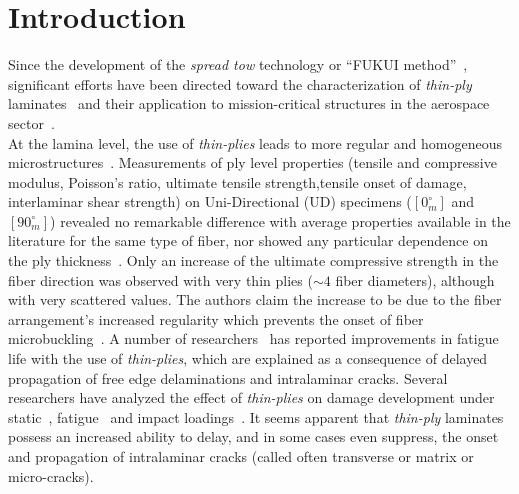 \documentclass[review]{elsarticle}
\begin{document}
\linenumbers


\section{Introduction}

Since the development of the \emph{spread tow} technology or ``FUKUI method''~\cite{Kawabe2008}, significant efforts have been directed toward the characterization of \emph{thin-ply} laminates~\cite{Yamaguchi2005,Sihn2007,Yokozeki2008,Yokozeki2010,Saito2012,Arteiro2013,Arteiro2014,Amacher2014,Guillamet2014,Cugnoni2018} and their application to mission-critical structures in the aerospace sector~\cite{Kopp2017}.\\%
At the lamina level, the use of \emph{thin-plies} leads to more regular and homogeneous microstructures~\cite{Saito2012,Amacher2014}. Measurements of ply level properties (tensile and compressive modulus, Poisson's ratio, ultimate tensile strength,tensile onset of damage, interlaminar shear strength) on Uni-Directional (UD) specimens ($\left[0_{m}^{\circ}\right]$ and $\left[90_{m}^{\circ}\right]$) revealed no remarkable difference with average properties available in the literature for the same type of fiber, nor showed any particular dependence on the ply thickness~\cite{Amacher2014}. Only an increase of the ultimate compressive strength in the fiber direction was observed with very thin plies ($\sim4$ fiber diameters), although with very scattered values. The authors claim the increase to be due to the fiber arrangement's increased regularity which prevents the onset of fiber microbuckling~\cite{Amacher2014}. A number of researchers~\cite{Yamaguchi2005,Sihn2007,Yokozeki2008} has reported improvements in fatigue life with the use of \emph{thin-plies}, which are explained as a consequence of delayed propagation of free edge delaminations and intralaminar cracks. Several researchers have analyzed the effect of \emph{thin-plies} on damage development under static~\cite{Sihn2007,Yokozeki2008,Yokozeki2010,Saito2012,Arteiro2013,Arteiro2014,Amacher2014}, fatigue~\cite{Yamaguchi2005,Sihn2007,Yokozeki2008,Yokozeki2010,Amacher2014} and impact loadings~\cite{Sihn2007,Yokozeki2008,Yokozeki2010,Amacher2014}. It seems apparent that \emph{thin-ply} laminates possess an increased ability to delay, and in some cases even suppress, the onset and propagation of intralaminar cracks (called often transverse or matrix or micro-cracks).\\
\end{document}
